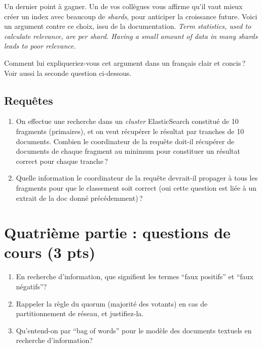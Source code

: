 \documentclass[11pt,a4paper]{article}
\begin{document}
Un dernier point à gagner. Un de vos collègues vous affirme qu'il vaut mieux
créer un index avec beaucoup de \textit{shards}, pour anticiper la croissance future. Voici
un argument contre ce choix, issu de la documentation.
\textit{Term statistics, used to calculate relevance, are per shard. Having a small amount of 
data in many shards leads to poor relevance.} 

Comment lui expliqueriez-vous cet argument dans un français clair et concis\,? Voir aussi la seconde question ci-dessous.

\subsection*{Requêtes}

\begin{enumerate}

  \item On effectue une recherche dans un \textit{cluster} ElasticSearch constitué de 10 fragments (primaires), et on veut récupérer
      le résultat par tranches de 10 documents. Combien le coordinateur de la requête
      doit-il récupérer  de documents de chaque 
      fragment au minimum pour constituer un résultat correct pour chaque tranche\,? 

  \item Quelle information le coordinateur de la requête
    devrait-il propager à tous les fragments pour que le classement soit correct (oui cette question est liée
    à un extrait de la doc donné précédemment)\,? 

 \end{enumerate}



\section*{Quatrième partie : questions de cours (3 pts)}


\begin{enumerate}
  \item En recherche d’information, que signifient les termes ``faux positifs'' et ``faux négatifs''?
  \item Rappeler la règle du quorum (majorité des votants) en cas de partitionnement de réseau, et justifiez-la.
   \item Qu’entend-on par ``bag of words'' pour le modèle des documents textuels en recherche d’information?
\end{enumerate}
\end{document}
